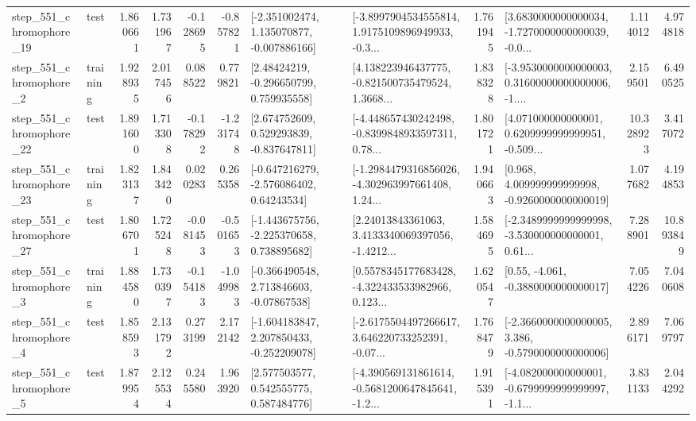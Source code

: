 \begin{tabular}{llrrrrllrlrr}
  step\_551\_chromophore\_19 &      test &      1.860661 &    1.731967 &     -0.128695 & -0.857821 &   [-2.351002474, 1.135070877, -0.007886166] &  [-3.8997904534555814, 1.9175109896949933, -0.3... &       1.761945 &  [3.6830000000000034, -1.7270000000000039, -0.0... &            1.114012 &          4.974818 \\
   step\_551\_chromophore\_2 &  training &      1.928935 &    2.017456 &      0.088522 &  0.779821 &     [2.48424219, -0.296650799, 0.759935558] &  [4.138223946437775, -0.821500735479524, 1.3668... &       1.838328 &  [-3.9530000000000003, 0.31600000000000006, -1.... &            2.159501 &          6.490525 \\
  step\_551\_chromophore\_22 &      test &      1.891600 &    1.713308 &     -0.178292 & -1.231748 &    [2.674752609, 0.529293839, -0.837647811] &  [-4.448657430242498, -0.8399848933597311, 0.78... &       1.801721 &  [4.071000000000001, 0.6209999999999951, -0.509... &           10.328923 &          3.417072 \\
  step\_551\_chromophore\_23 &  training &      1.823137 &    1.843420 &      0.020283 &  0.265358 &    [-0.647216279, -2.576086402, 0.64243534] &  [-1.2984479316856026, -4.302963997661408, 1.24... &       1.940663 &    [0.968, 4.009999999999998, -0.9260000000000019] &            1.077682 &          4.194853 \\
  step\_551\_chromophore\_27 &      test &      1.806701 &    1.725248 &     -0.081453 & -0.501653 &   [-1.443675756, -2.225370658, 0.738895682] &  [2.24013843361063, 3.4133340069397056, -1.4212... &       1.584695 &  [-2.3489999999999998, -3.530000000000001, 0.61... &            7.288901 &         10.893849 \\
   step\_551\_chromophore\_3 &  training &      1.884580 &    1.730397 &     -0.154183 & -1.049983 &    [-0.366490548, 2.713846603, -0.07867538] &  [0.5578345177683428, -4.322433533982966, 0.123... &       1.620547 &                [0.55, -4.061, -0.3880000000000017] &            7.054226 &          7.040608 \\
   step\_551\_chromophore\_4 &      test &      1.858593 &    2.131792 &      0.273199 &  2.172142 &   [-1.604183847, 2.207850433, -0.252209078] &  [-2.6175504497266617, 3.646220733252391, -0.07... &       1.768479 &  [-2.3660000000000005, 3.386, -0.5790000000000006] &            2.896171 &          7.069797 \\
   step\_551\_chromophore\_5 &      test &      1.879954 &    2.125534 &      0.245580 &  1.963920 &     [2.577503577, 0.542555775, 0.587484776] &  [-4.390569131861614, -0.5681200647845641, -1.2... &       1.915391 &  [-4.082000000000001, -0.6799999999999997, -1.1... &            3.831133 &          2.044292 \\

\end{tabular}
